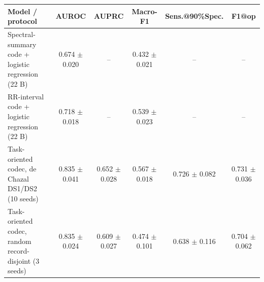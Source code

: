 \begin{tabular}{lccccc}
\toprule
Model / protocol & AUROC & AUPRC & Macro-F1 & Sens.@90\%Spec. & F1@op \\
\midrule
Spectral-summary code + logistic regression (22 B) & 0.674 $\pm$ 0.020 & -- & 0.432 $\pm$ 0.021 & -- & -- \\
RR-interval code + logistic regression (22 B) & 0.718 $\pm$ 0.018 & -- & 0.539 $\pm$ 0.023 & -- & -- \\
Task-oriented codec, de Chazal DS1/DS2 (10 seeds) & 0.835 $\pm$ 0.041 & 0.652 $\pm$ 0.028 & 0.567 $\pm$ 0.018 & 0.726 $\pm$ 0.082 & 0.731 $\pm$ 0.036 \\
Task-oriented codec, random record-disjoint (3 seeds) & 0.835 $\pm$ 0.024 & 0.609 $\pm$ 0.027 & 0.474 $\pm$ 0.101 & 0.638 $\pm$ 0.116 & 0.704 $\pm$ 0.062 \\
\bottomrule
\end{tabular}
